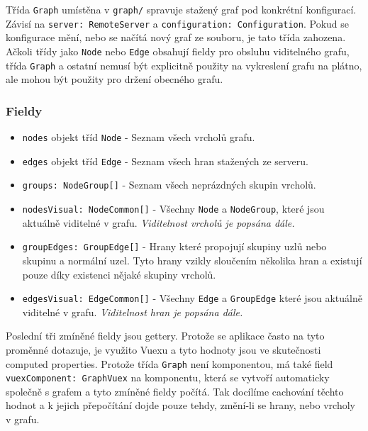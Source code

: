 Třída \texttt{Graph} umístěna v \texttt{graph/} spravuje stažený graf pod konkrétní konfigurací. Závisí na \texttt{server: RemoteServer} a \texttt{configuration: Configuration}. Pokud se konfigurace mění, nebo se načítá nový graf ze souboru, je tato třída zahozena. Ačkoli třídy jako \texttt{Node} nebo \texttt{Edge} obsahují fieldy pro obsluhu viditelného grafu, třída \texttt{Graph} a ostatní nemusí být explicitně použity na vykreslení grafu na plátno, ale mohou být použity pro držení obecného grafu.

\subsubsection*{Fieldy}
\begin{itemize}
  \item \texttt{nodes} objekt tříd \texttt{Node} - Seznam všech vrcholů grafu.
  \item \texttt{edges} objekt tříd \texttt{Edge} - Seznam všech hran stažených ze serveru.
  \item \texttt{groups: NodeGroup[]} - Seznam všech neprázdných skupin vrcholů.
  \item \texttt{nodesVisual: NodeCommon[]} - Všechny \texttt{Node} a \texttt{NodeGroup}, které jsou aktuálně viditelné v grafu. \textit{Viditelnost vrcholů je popsána dále.}
  \item \texttt{groupEdges: GroupEdge[]} - Hrany které propojují skupiny uzlů nebo skupinu a normální uzel. Tyto hrany vzikly sloučením několika hran a existují pouze díky existenci nějaké skupiny vrcholů.
  \item \texttt{edgesVisual: EdgeCommon[]} - Všechny \texttt{Edge} a \texttt{GroupEdge} které jsou aktuálně viditelné v grafu. \textit{Viditelnost hran je popsána dále.}
\end{itemize}

Poslední tři zmíněné fieldy jsou gettery. Protože se aplikace často na tyto proměnné dotazuje, je využito Vuexu a tyto hodnoty jsou ve skutečnosti computed properties. Protože třída \texttt{Graph} není komponentou, má také field \texttt{vuexComponent: GraphVuex} na komponentu, která se vytvoří automaticky společně s grafem a tyto zmíněné fieldy počítá. Tak docílíme cachování těchto hodnot a k jejich přepočítání dojde pouze tehdy, změní-li se hrany, nebo vrcholy v grafu.

